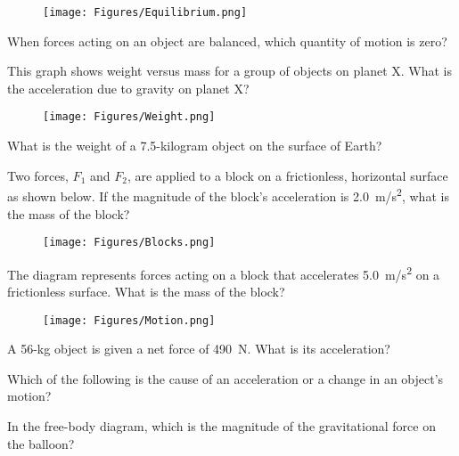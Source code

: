\documentclass{exam}
\begin{document}
\begin{questions}
\begin{figure}[h!]
    \centering
    \texttt{[image: Figures/Equilibrium.png]}
\end{figure}


\question
When forces acting on an object are balanced, which quantity of motion is zero?


\question
This graph shows weight versus mass for a group of objects on planet X. What is the acceleration due to gravity on planet X?

\begin{figure}[h!]
    \centering
    \texttt{[image: Figures/Weight.png]}
\end{figure}

\question
What is the weight of a 7.5-kilogram object on the surface of Earth?

\question
Two forces, $F_1$ and $F_2$, are applied to a block on a frictionless, horizontal surface as shown below. If the magnitude of the block's acceleration is \SI{2.0}{m/s^2}, what is the mass of the block?

\begin{figure}[h!]
    \centering
    \texttt{[image: Figures/Blocks.png]}
\end{figure}

\question
The diagram represents forces acting on a block that accelerates \SI{5.0}{m/s^2} on a frictionless surface. What is the mass of the block?

\begin{figure}[h!]
    \centering
    \texttt{[image: Figures/Motion.png]}
\end{figure}

\question
A 56-kg object is given a net force of \SI{490}{N}. What is its acceleration?

\question
Which of the following is the cause of an acceleration or a change in an object's motion?

\question
In the free-body diagram, which is the magnitude of the gravitational force on the balloon?

\begin{figure}[h!]
\centering
{}
\end{figure}


\end{questions}
\end{document}

